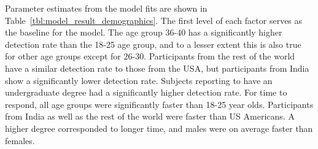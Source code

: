 \documentclass[10pt]{article}\usepackage[]{graphicx}\usepackage[]{xcolor}
\begin{document}



Parameter estimates from the model fits are shown in Table~\ref{tbl:model_result_demographics}. The first level of each factor serves as the baseline for the model. The age group 36-40  has a significantly higher detection rate than the 18-25 age group, and to a lesser extent this is also true for other age groups except for 26-30. Participants from the rest of the world have a similar detection rate to those from the USA, but participants from India show a significantly lower detection rate. Subjects reporting to have  an undergraduate degree had a significantly higher detection rate. For time to respond, all age groups were significantly faster than  18-25 year olds.  Participants from India as well as the rest of the world were faster than US Americans. A higher degree corresponded to longer time, and males were on average faster than females.
\end{document}
